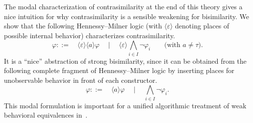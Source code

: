 \documentclass[10pt,a4paper]{article}
\begin{document}
The modal characterization of contrasimilarity at the end of this theory gives a nice intuition
for why contrasimilarity is a sensible weakening for bisimilarity. We show that the following
Hennessy--Milner logic (with $\langle \varepsilon \rangle$ denoting places of possible internal
behavior) characterizes contrasimilarity.
\[
  \varphi  ::= \quad \langle \varepsilon \rangle \langle a\rangle \varphi
    \quad \mid \quad \langle \varepsilon \rangle \bigwedge_{i \in I} \neg \varphi_i
       \qquad \text{(with $a \neq \tau$).}
\]
It is a ``nice'' abstraction of strong bisimilarity, since it can be obtained from the following
complete fragment of Hennessy--Milner logic by inserting places for unobservable behavior in front of
each constructor.
\[
    \varphi  ::= \quad \langle a \rangle \varphi
      \quad \mid \quad \bigwedge_{i \in I} \neg \varphi_i .
\]
This modal formulation is important for a unified algorithmic treatment of weak behavioral equivalences
in~\cite{bj2023ltbtsSilentSteps}.



{}


\end{document}

